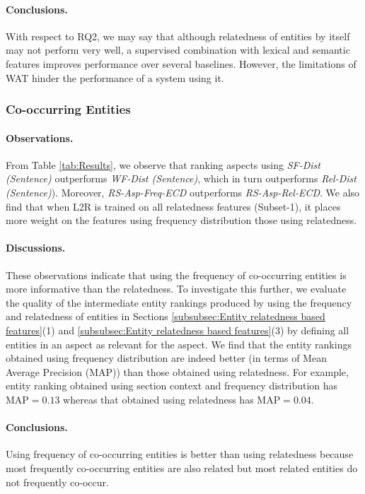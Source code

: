 \paragraph{\textbf{Conclusions.}}
With respect to RQ2, we may say that although relatedness of entities by itself may not perform very well, a supervised combination with lexical and semantic features improves performance over several baselines. However, the limitations of WAT hinder the performance of a system using it.


\subsubsection{Co-occurring Entities}
\label{Co-occurring Entities}

\paragraph{\textbf{Observations.}}
From Table \ref{tab:Results}, we observe that ranking aspects using \textit{SF-Dist (Sentence)} outperforms \textit{WF-Dist (Sentence)}, which in turn outperforms \textit{Rel-Dist (Sentence)}). Moreover, \textit{RS-Asp-Freq-ECD} outperforms \textit{RS-Asp-Rel-ECD}. We also find that when L2R is trained on all relatedness features (Subset-1), it places more weight on the features using frequency distribution those using relatedness. 

\paragraph{\textbf{Discussions.}}
These observations indicate that using the frequency of co-occurring entities is more informative than the relatedness. To investigate this further, we evaluate the quality of the intermediate entity rankings produced by using the frequency and relatedness of entities in Sections \ref{subsubsec:Entity relatedness based features}(1) and \ref{subsubsec:Entity relatedness based features}(3) by defining all entities in an aspect as relevant for the aspect. We find that the entity rankings obtained using frequency distribution are indeed better (in terms of
Mean Average Precision (MAP)) than those obtained using relatedness. For example, entity ranking obtained using section context and frequency distribution has
$\text{MAP}=0.13$ whereas that obtained using relatedness has $\text{MAP}=0.04$. 

\paragraph{\textbf{Conclusions.}}
Using frequency of co-occurring entities is better than using relatedness because most frequently co-occurring entities are also related but most related entities do not frequently co-occur.
